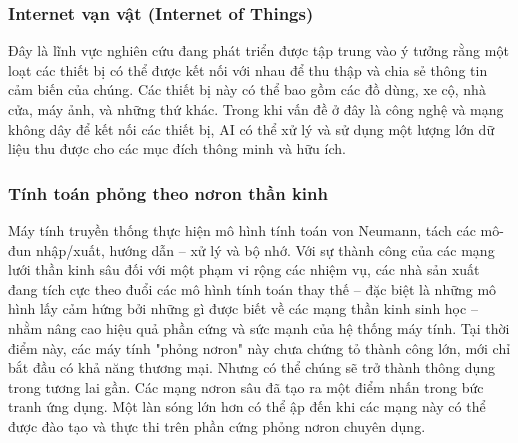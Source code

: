 \subsubsection{Internet vạn vật (Internet of Things)}
Đây là lĩnh vực nghiên cứu đang phát triển được tập trung vào ý tưởng rằng một loạt các thiết bị có thể được kết nối với nhau để thu thập và chia sẻ thông tin cảm biến của chúng. Các thiết bị này có thể bao gồm các đồ dùng, xe cộ, nhà cửa, máy ảnh, và những thứ khác. Trong khi vấn đề ở đây là công nghệ và mạng không dây để kết nối các thiết bị, AI có thể xử lý và sử dụng một lượng lớn dữ liệu thu được cho các mục đích thông minh và hữu ích.
\subsubsection{Tính toán phỏng theo nơron thần kinh}
Máy tính truyền thống thực hiện mô hình tính toán von Neumann, tách các mô-đun nhập/xuất, hướng dẫn – xử lý và bộ nhớ. Với sự thành công của các mạng lưới thần kinh sâu đối với một phạm vi rộng các nhiệm vụ, các nhà sản xuất đang tích cực theo đuổi các mô hình tính toán thay thế – đặc biệt là những mô hình lấy cảm hứng bởi những gì được biết về các mạng thần kinh sinh học – nhằm nâng cao hiệu quả phần cứng và sức mạnh của hệ thống máy tính. Tại thời điểm này, các máy tính "phỏng nơron" này chưa chứng tỏ thành công lớn, mới chỉ bắt đầu có khả năng thương mại. Nhưng có thể chúng sẽ trở thành thông dụng trong tương lai gần. Các mạng nơron sâu đã tạo ra một điểm nhấn trong bức tranh ứng dụng. Một làn sóng lớn hơn có thể ập đến khi các mạng này có thể được đào tạo và thực thi trên phần cứng phỏng nơron chuyên dụng.

